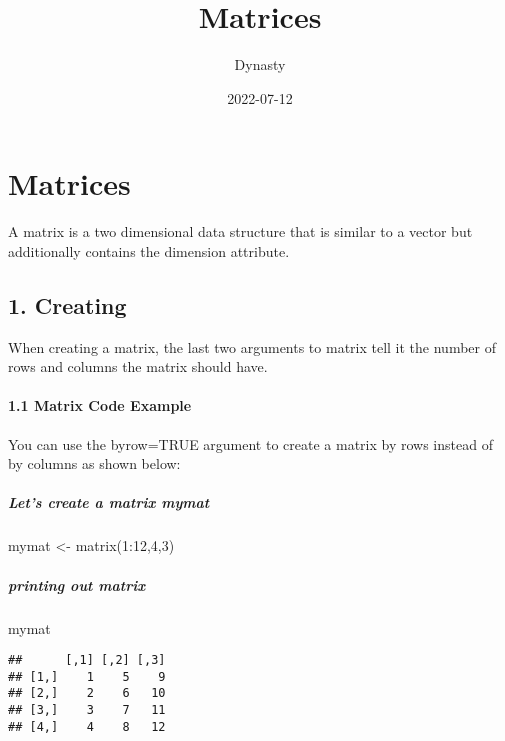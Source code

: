 \documentclass[
]{article}
\title{Matrices}
\author{Dynasty}
\date{2022-07-12}
\newenvironment{Shaded}{\begin{snugshade}}{\end{snugshade}}
\newcommand{\DecValTok}[1]{\textcolor[rgb]{0.00,0.00,0.81}{#1}}
\newcommand{\FunctionTok}[1]{\textcolor[rgb]{0.00,0.00,0.00}{#1}}
\newcommand{\NormalTok}[1]{#1}
\newcommand{\OtherTok}[1]{\textcolor[rgb]{0.56,0.35,0.01}{#1}}
\newcommand{\SpecialCharTok}[1]{\textcolor[rgb]{0.00,0.00,0.00}{#1}}
\begin{document}
\maketitle

\hypertarget{matrices}{%
\section{Matrices}\label{matrices}}

A matrix is a two dimensional data structure that is similar to a vector
but additionally contains the dimension attribute.

\hypertarget{creating}{%
\subsection{1. Creating}\label{creating}}

When creating a matrix, the last two arguments to matrix tell it the
number of rows and columns the matrix should have.

\hypertarget{matrix-code-example}{%
\paragraph{1.1 Matrix Code Example}\label{matrix-code-example}}

You can use the byrow=TRUE argument to create a matrix by rows instead
of by columns as shown below:

\hypertarget{lets-create-a-matrix-mymat}{%
\subparagraph{Let's create a matrix
mymat}\label{lets-create-a-matrix-mymat}}

\begin{Shaded}
\begin{Highlighting}[]
\NormalTok{mymat }\OtherTok{\textless{}{-}} \FunctionTok{matrix}\NormalTok{(}\DecValTok{1}\SpecialCharTok{:}\DecValTok{12}\NormalTok{,}\DecValTok{4}\NormalTok{,}\DecValTok{3}\NormalTok{)}
\end{Highlighting}
\end{Shaded}

\hypertarget{printing-out-matrix}{%
\subparagraph{printing out matrix}\label{printing-out-matrix}}

\begin{Shaded}
\begin{Highlighting}[]
\NormalTok{mymat}
\end{Highlighting}
\end{Shaded}

\begin{verbatim}
##      [,1] [,2] [,3]
## [1,]    1    5    9
## [2,]    2    6   10
## [3,]    3    7   11
## [4,]    4    8   12
\end{verbatim}
\end{document}
